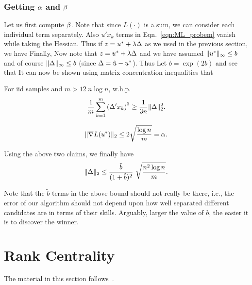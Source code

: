 \documentclass[letterpaper, 11pt, reqno]{amsart}
\begin{document}
\subsubsection{Getting $\alpha$ and $\beta$}
Let us first compute $\beta$. Note that since $L(\cdot)$ is a sum, we can consider each individual term separately. Also $u' x_k$ terms in Eqn.~\eqref{eqn:ML_probem} vanish while taking the Hessian. Thus if $z = u^* + \lambda \Delta$ as we used in the previous section, we have
Finally,
Now note that $z = u^* + \lambda \Delta$ and we have assumed $\lVert u^*\rVert_\infty \leq b$ and of course $\lVert\Delta\rVert_\infty \leq b$ (since $\Delta = \hat{u} - u^*$). Thus
Let $\tilde{b} = \exp(2b)$ and see that
It can now be shown using matrix concentration inequalities that
\begin{claim}
For iid samples and $m > 12\ n \log n$, w.h.p.
$$
\frac{1}{m} \sum_{k=1}^m \left(\Delta' x_k\right)^2 \geq \frac{1}{3n} \lVert\Delta\rVert^2_2.
$$
\end{claim}
\begin{claim}
$$\lVert\nabla L(u^*)\rVert_2 \leq 2 \sqrt{\frac{\log n}{m}} = \alpha.$$
\end{claim}
Using the above two claims, we finally have
$$
\norm{\D}_2 \leq \f{\tilde{b}}{(1+\tilde{b})^2}\ \sqrt{\f{n^2 \log n}{m}}.
$$
\begin{remark}
Note that the $\tilde{b}$ terms in the above bound should not really be there, i.e., the error of our algorithm should not depend upon how well separated different candidates are in terms of their skills. Arguably, larger the value of $b$, the easier it is to discover the winner.

\end{remark}


\section{Rank Centrality}
The material in this section follows~\cite{rank_centrality}.

{
\linespread{1.5}


}
\end{document}
